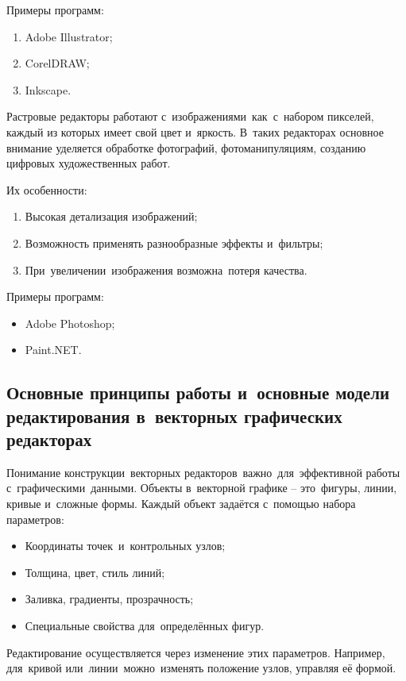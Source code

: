 \documentclass{ou}
\begin{document}
Примеры программ:
\begin{enumerate}[leftmargin=0em, itemindent=3.75em, nosep, label=\arabic*)]
  \item Adobe Illustrator;
  \item CorelDRAW;
  \item Inkscape.
\end{enumerate}

Растровые редакторы работают с~изображениями~как~с~набором пикселей, каждый из которых имеет свой цвет и~яркость. В~таких редакторах основное внимание уделяется обработке фотографий, фотоманипуляциям, созданию цифровых художественных работ.

Их особенности:
\begin{enumerate}[leftmargin=0em, itemindent=3.75em, nosep, label=\arabic*)]
  \item Высокая детализация изображений;
  \item Возможность применять разнообразные эффекты и~фильтры;
  \item При~увеличении~изображения возможна~потеря качества.
\end{enumerate}

Примеры программ: 
\begin{itemize}[label=-, leftmargin=0em, itemindent=3.35em, nosep]
  \item Adobe Photoshop;
  \item Paint.NET.
\end{itemize}
\subsection{Основные принципы работы и~основные модели редактирования в~векторных графических редакторах}
Понимание конструкции~векторных редакторов~важно~для~эффективной работы с~графическими~данными. Объекты в~векторной графике -- это~фигуры, линии, кривые и~сложные формы. Каждый объект задаётся с~помощью набора параметров:
\begin{itemize}[label=-, leftmargin=0em, itemindent=3.35em, nosep]
  \item Координаты точек~и~контрольных узлов;
  \item Толщина, цвет, стиль линий;
  \item Заливка, градиенты, прозрачность;
  \item Специальные свойства для~определённых фигур.
\end{itemize}

Редактирование осуществляется через изменение этих параметров. Например, для~кривой или~линии~можно~изменять положение узлов, управляя её формой.
\end{document}
